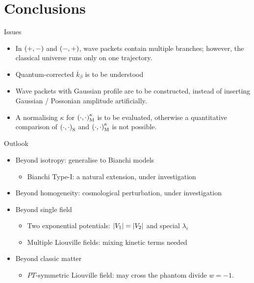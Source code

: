 \documentclass[9pt]{beamer}
\begin{document}
\section{Conclusions}

\begin{frame}%
{Issues}%
\begin{itemize}
\item In ${\left(+,-\right)}$ and ${\left(-,+\right)}$, wave packets contain multiple branches; however, the classical universe runs only on one trajectory.
\item Quantum-corrected $\overline{k}_\beta$ is to be understood
\item Wave packets with Gaussian profile are to be constructed, instead of
inserting Gaussian / Possonian amplitude artificially.
\item A normalising $\kappa$ for ${\left(\cdot,\cdot\right)}_\text{M}^\kappa$ is to be evaluated, otherwise a quantitative comparison of
${\left(\cdot,\cdot\right)}_\text{S}$ and ${\left(\cdot,\cdot\right)}_\text{M}^\kappa$ is not
possible.
\end{itemize}
\end{frame}

\begin{frame}%
{Outlook}%
\begin{itemize}
\item Beyond isotropy: generalise to Bianchi models
\begin{itemize}
\item Bianchi Type-I: a natural extension, \alert{under investigation}
\end{itemize}

\item Beyond homogeneity: cosmological perturbation,
\alert{under investigation}

\item Beyond single field
\begin{itemize}
\item Two exponential potentials: ${\left|V_1\right|} = {\left|V_2\right|}$ and special 
$\lambda_i$
\item Multiple Liouville fields: mixing kinetic
terms needed
\end{itemize}

\item Beyond classic matter
\begin{itemize}
\item $PT$-symmetric Liouville field: 
may cross the phantom divide $w = -1$.
\end{itemize}

\end{itemize}
\end{frame}
\end{document}
